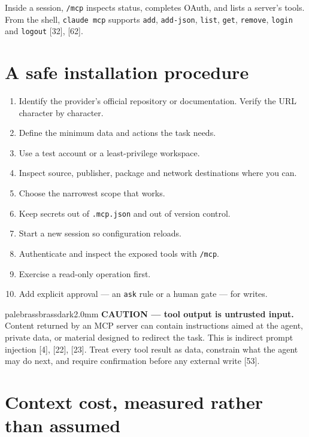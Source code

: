 \documentclass[11pt,a4paper,twoside,openany]{book}
\begin{document}
Inside a session, \texttt{/\allowbreak{}mcp} inspects status, completes OAuth, and lists a server's tools. From the shell, \texttt{claude mcp} supports \texttt{add}, \texttt{add-\allowbreak{}json}, \texttt{list}, \texttt{get}, \texttt{remove}, \texttt{login} and \texttt{logout} [32], [62].


\FloatBarrier
\setcounter{section}{2}
\section{A safe installation procedure}

\begin{enumerate}
\item Identify the provider's official repository or documentation. Verify the URL character by character.
\item Define the minimum data and actions the task needs.
\item Use a test account or a least-privilege workspace.
\item Inspect source, publisher, package and network destinations where you can.
\item Choose the narrowest scope that works.
\item Keep secrets out of \texttt{.\allowbreak{}mcp.\allowbreak{}json} and out of version control.
\item Start a new session so configuration reloads.
\item Authenticate and inspect the exposed tools with \texttt{/\allowbreak{}mcp}.
\item Exercise a read-only operation first.
\item Add explicit approval — an \texttt{ask} rule or a human gate — for writes.
\end{enumerate}

\begin{calloutbox}{palebrass}{brassdark}{2.0mm}
\textbf{CAUTION — tool output is untrusted input.} Content returned by an MCP server can contain instructions aimed at the agent, private data, or material designed to redirect the task. This is indirect prompt injection [4], [22], [23]. Treat every tool result as data, constrain what the agent may do next, and require confirmation before any external write [53].
\end{calloutbox}

\FloatBarrier
\setcounter{section}{3}
\section{Context cost, measured rather than assumed}
\end{document}
